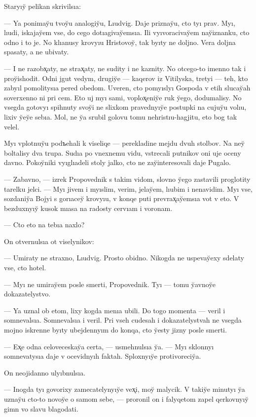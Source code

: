 \documentclass[10pt]{book}
\begin{document}
Staryıy̆ pelikan skrivilsıa:

— Ya ponimay̆u tvoy̆u analogiy̆u, Lıudvig. Daje priznay̆u, cto tyı prav. Myı, lıudi, iskajay̆em vse, do cego dotıagivay̆emsıa. Ili vyıvoracivay̆em nay̆iznanku, cto odno i to je. No klıanusy krovyıu Hristovoy̆, tak byıty ne doljno. Vera doljna spasaty, a ne ubivaty.

— I ne razobx̨aty, ne strax̨aty, ne sudity i ne kaznity. No otcego-to imenno tak i proy̆ishodit. Odni jgut vedym, drugiy̆e — kaqerov iz Vitilyska, tretyi — teh, kto zabyıl pomolitysıa pered obedom. Uveren, cto pomyıslyı Gospoda v etih slucay̆ah soverxenno ni pri cem. Eto uj myı sami, voplox̨eniy̆e ruk y̆ego, dodumalisy. No vsegda gotovyı spihnuty svoy̆i ne slixkom pravednyıy̆e postupki na cujuy̆u volıu, lixiv y̆ey̆e sebıa. Mol, ne y̆a srubil golovu tomu nehristıu-hagjitu, eto bog tak velel.

Myı vplotnuy̆u podъehali k viseliqe — perekladine mejdu dvuh stolbov. Na ney̆ boltalisy dva trupa. Sudıa po vnexnemu vidu, vstrecali putnikov oni uje oceny davno. Pokoy̆niki vyıglıadeli stoly jalko, cto ne zay̆interesovali daje Pugalo.

— Zabavno, — izrek Propovednik s takim vidom, slovno y̆ego zastavili proglotity tarelku jelci. — Myı jivem i myıslim, verim, jelay̆em, lıubim i nenavidim. Myı vse, sozdaniy̆a Bojyi s gorıacey̆ krovyıu, v konqe puti prevrax̨ay̆emsıa vot v eto. V bezduxnyıy̆ kusok mıasa na radosty cervıam i voronam.

— Cto eto na tebıa naxlo?

On otvernulsıa ot viselynikov:

— Umiraty ne straxno, Lıudvig. Prosto obidno. Nikogda ne uspevay̆exy sdelaty vse, cto hotel.

— Myı ne umiray̆em posle smerti, Propovednik. Tyı — tomu y̆avnoy̆e dokazatelystvo.

— Ya uznal ob etom, lixy kogda menıa ubili. Do togo momenta — veril i somnevalsıa. Somnevalsıa i veril. Pri vseh cudesah i dokazatelystvah ne vsegda mojno iskrenne byıty ubejdennyım do konqa, cto y̆esty jizny posle smerti.

— Ex̨e odna celoveceskay̆a certa, — usmehnulsıa y̆a. — Myı sklonnyı somnevatysıa daje v ocevidnyıh faktah. Sploxnyıy̆e protivoreciy̆a.

On neojidanno ulyıbnulsıa.

— Inogda tyı govorixy zamecatelynyıy̆e vex̨i, moy̆ malycik. V takiy̆e minutyı y̆a uznay̆u cto-to novoy̆e o samom sebe, — proronil on i falyqetom zapel qerkovnyıy̆ gimn vo slavu blagodati.
\end{document}
